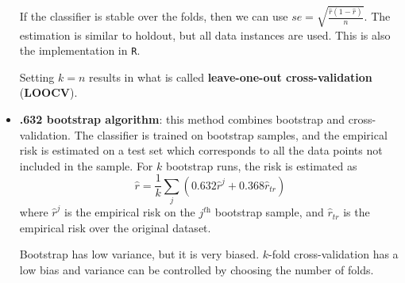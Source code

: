 \begin{itemize}
    If the classifier is stable over the folds, then we can use $se = \sqrt{\frac{\hat{r}(1-\hat{r})}{n}}$. The estimation is similar to holdout, but all data instances are used. This is also the implementation in \texttt{R}.

    Setting $k=n$ results in what is called \textbf{leave-one-out cross-validation} (\textbf{LOOCV}).
    \item \textbf{.632 bootstrap algorithm}: this method combines bootstrap and cross-validation. The classifier is trained on bootstrap samples, and the empirical risk is estimated on a test set which corresponds to all the data points not included in the sample. For $k$ bootstrap runs, the risk is estimated as
    \begin{equation*}
        \hat{r} = \frac{1}{k} \sum_j (0.632 \hat{r}^j + 0.368 \hat{r}_{tr})
    \end{equation*}
    where $\hat{r}^j$ is the empirical risk on the $j^{\textit{th}}$ bootstrap sample, and $\hat{r}_{tr}$ is the empirical risk over the original dataset.

    Bootstrap has low variance, but it is very biased. $k$-fold cross-validation has a low bias and variance can be controlled by choosing the number of folds.
\end{itemize}
